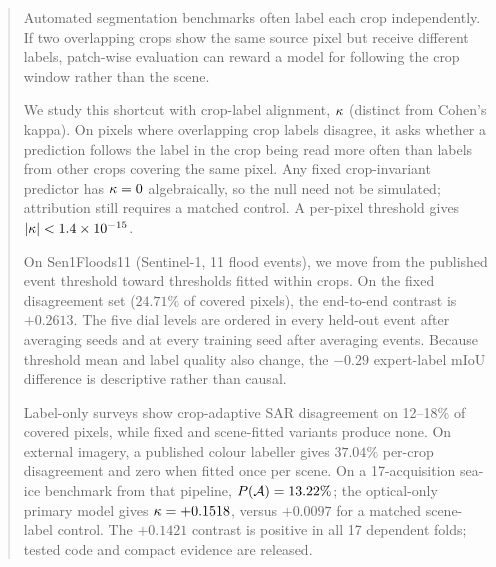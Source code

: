 \begin{abstract}
Automated segmentation benchmarks often label each crop independently. If two
overlapping crops show the same source pixel but receive different labels, patch-wise
evaluation can reward a model for following the crop window rather than the scene.

We study this shortcut with crop-label alignment, $\kap$ (distinct from Cohen's
kappa). On pixels where overlapping crop labels disagree, it asks whether a
prediction follows the label in the crop being read more often than labels from
other crops covering the same pixel. Any fixed crop-invariant predictor has
$\kap=0$ algebraically, so the null need not be simulated; attribution still
requires a matched control. A per-pixel threshold gives
$|\kap|<1.4\times10^{-15}$.

On Sen1Floods11 (Sentinel-1, 11 flood events), we move from the published event
threshold toward thresholds fitted within crops. On the fixed disagreement set
($24.71\%$ of covered pixels), the end-to-end contrast is $+0.2613$. The five dial
levels are ordered in every held-out event after averaging seeds and at every
training seed after averaging events. Because threshold mean and label quality also
change, the $-0.29$ expert-label mIoU difference is descriptive rather than causal.

Label-only surveys show crop-adaptive SAR disagreement on 12--18\% of covered
pixels, while fixed and scene-fitted variants produce none. On external imagery, a
published colour labeller gives $37.04\%$ per-crop disagreement and zero when fitted
once per scene. On a 17-acquisition sea-ice benchmark from that pipeline,
$P(\A)=13.22\%$; the optical-only primary model gives $\kap=+0.1518$, versus
$+0.0097$ for a matched scene-label control. The $+0.1421$ contrast is positive in
all 17 dependent folds; tested code and compact evidence are released.
\end{abstract}
